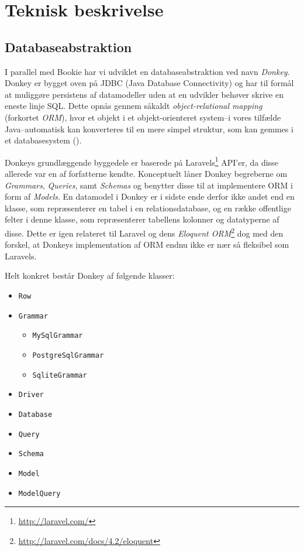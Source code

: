\chapter{Teknisk beskrivelse}

\section{Databaseabstraktion}

I parallel med Bookie har vi udviklet en databaseabstraktion ved navn \textit{Donkey}. Donkey er bygget oven på JDBC (Java Database Connectivity) og har til formål at muliggøre persistens af datamodeller uden at en udvikler behøver skrive en eneste linje SQL. Dette opnås gennem såkaldt \textit{object-relational mapping} (forkortet \textit{ORM}), hvor et objekt i et objekt-orienteret system–i vores tilfælde Java–automatisk kan konverteres til en mere simpel struktur, som kan gemmes i et databasesystem (\cite{wiki:orm}).

Donkeys grundlæggende byggedele er baserede på Laravels\footnote{\url{http://laravel.com/}} API'er, da disse allerede var en af forfatterne kendte. Konceptuelt låner Donkey begreberne om \textit{Grammars}, \textit{Queries}, samt \textit{Schemas} og benytter disse til at implementere ORM i form af \textit{Models}. En datamodel i Donkey er i sidste ende derfor ikke andet end en klasse, som repræsenterer en tabel i en relationsdatabase, og en række offentlige felter i denne klasse, som repræsenterer tabellens kolonner og datatyperne af disse. Dette er igen relateret til Laravel og dens \textit{Eloquent ORM}\footnote{\url{http://laravel.com/docs/4.2/eloquent}} dog med den forskel, at Donkeys implementation af ORM endnu ikke er nær så fleksibel som Laravels.

Helt konkret består Donkey af følgende klasser:

\begin{multicols}{2}
\begin{itemize}
  \item \texttt{Row}
  \item \texttt{Grammar}
    \begin{itemize}
      \item \texttt{MySqlGrammar}
      \item \texttt{PostgreSqlGrammar}
      \item \texttt{SqliteGrammar}
    \end{itemize}
  \item \texttt{Driver}
  \item \texttt{Database}
  \item \texttt{Query}
  \item \texttt{Schema}
  \item \texttt{Model}
  \item \texttt{ModelQuery}
\end{itemize}
\end{multicols}

